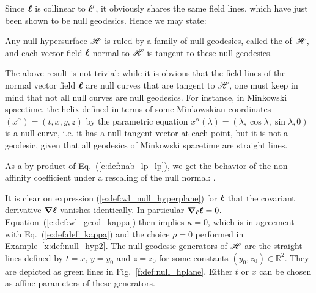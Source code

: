 Since $\bm{\ell}$ is collinear to $\bm{\ell}'$, it obviously shares the same field lines,
which have just been shown to be null geodesics. Hence we may state:

\begin{prop}
\label{p:def:null_geod_generators}
Any null hypersurface $\mathscr{H}$ is ruled by a family of null geodesics, called the
 of $\mathscr{H}$, and each vector field $\bm{\ell}$ normal to $\mathscr{H}$ is
tangent to these null geodesics.
\end{prop}

\begin{remark}
\label{r:def:null_curves}
The above result is not trivial: while it is obvious that the field lines of the normal
vector field $\bm{\ell}$ are null curves that are tangent to $\mathscr{H}$, one must
keep in mind that not all null curves are null geodesics. For instance, in
Minkowski spacetime, the helix defined in terms of
some Minkowskian coordinates $(x^\alpha)=(t,x,y,z)$ by the parametric equation
$x^\alpha(\lambda) = (\lambda, \cos\lambda, \sin\lambda, 0)$ is a null curve, i.e.
it has a null tangent vector at each point, but it is not a geodesic, given that
all geodesics of Minkowski spacetime are straight lines.
\end{remark}

As a by-product of Eq.~(\ref{e:def:nab_lp_lp}), we get the behavior of the
non-affinity coefficient under a rescaling of the null normal:
\be \label{e:def:rescale_kappa}
   .
\ee

\begin{example} \label{x:def:null_hyp3}
It is clear on expression (\ref{e:def:wl_null_hyperplane}) for $\bm{\ell}$ that
the covariant derivative
$\bm{\nabla} \bm{\ell}$ vanishes identically. In particular $\bm{\nabla}_{\bm{\ell}} \bm{\ell} = 0$.
Equation~(\ref{e:def:wl_geod_kappa}) then implies $\kappa = 0$,
which is in agreement with Eq.~(\ref{e:def:def_kappa}) and the choice $\rho=0$
performed in Example~\ref{x:def:null_hyp2}. The null geodesic generators of $\mathscr{H}$ are the
straight lines defined by $t=x$, $y=y_0$ and $z=z_0$ for some constants
$(y_0,z_0)\in \mathbb{R}^2$.
They are depicted as green lines in Fig.~\ref{f:def:null_hplane}.
 Either $t$ or $x$ can be chosen as affine
parameters of these generators.
\end{example}

